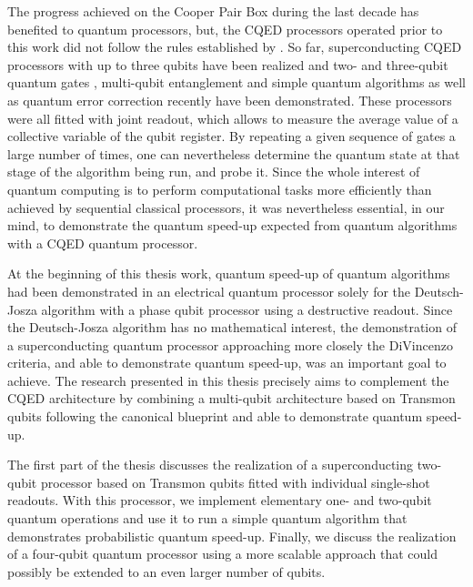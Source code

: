 The progress achieved on the Cooper Pair Box during the last decade has benefited to quantum processors, but, the CQED processors operated prior to  this work did not follow the rules established by \cite{divincenzo_physical_2000}.  So far, superconducting CQED processors with up to three qubits have been realized and two- and three-qubit quantum gates \citep{fedorov_implementation_2011}, multi-qubit entanglement \citep{dicarlo_preparation_2010} and simple quantum algorithms \citep{dicarlo_demonstration_2009} as well as quantum error correction recently  \citep{reed_realization_2011} have been demonstrated. These processors were all fitted with joint readout, which allows to measure the average value of a collective variable of the qubit register. By repeating a given sequence of gates a large number of times, one can nevertheless determine the quantum state at that stage of the algorithm being run, and probe it.
Since the whole interest of quantum computing is to perform computational tasks more efficiently than achieved by sequential classical processors, it was nevertheless essential, in our mind, to demonstrate the quantum speed-up expected from quantum algorithms with a CQED quantum processor.

  \smallskip

At the beginning of this thesis work, quantum speed-up of quantum algorithms had been   demonstrated in an electrical quantum processor solely for the Deutsch-Josza algorithm with   a phase qubit processor  using a destructive readout\cite{JohnMartinis2009}. Since the Deutsch-Josza algorithm has no mathematical interest, the demonstration of a  superconducting  quantum processor   approaching more closely  the DiVincenzo criteria, and able to demonstrate quantum speed-up, was an important goal to achieve. The research presented in this thesis  precisely  aims  to complement the CQED architecture by combining a multi-qubit architecture based on Transmon qubits  following the canonical blueprint and able to demonstrate quantum speed-up. 


\smallskip

The first part of the thesis discusses the realization of a superconducting two-qubit processor based on Transmon qubits fitted with individual single-shot readouts. With this processor, we implement elementary one- and two-qubit quantum operations and use it to run a simple quantum algorithm that demonstrates probabilistic quantum speed-up. Finally, we discuss the realization of a four-qubit quantum processor using a more scalable approach that could possibly be extended to an even larger number of qubits.

